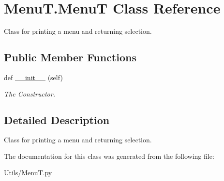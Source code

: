 \hypertarget{classMenuT_1_1MenuT}{}\section{Menu\+T.\+MenuT Class Reference}
\label{classMenuT_1_1MenuT}


Class for printing a menu and returning selection.  


\subsection*{Public Member Functions}
\begin{DoxyCompactItemize}
\item 
\mbox{\label{classMenuT_1_1MenuT_a560d1fcb631423d0214d5878d0cd6f06}} 
def \hyperlink{classMenuT_1_1MenuT_a560d1fcb631423d0214d5878d0cd6f06}{\+\_\+\+\_\+init\+\_\+\+\_\+} (self)
\begin{DoxyCompactList}\small\item\em The Constructor. \end{DoxyCompactList}\end{DoxyCompactItemize}


\subsection{Detailed Description}
Class for printing a menu and returning selection. 



The documentation for this class was generated from the following file\+:\begin{DoxyCompactItemize}
\item 
Utils/Menu\+T.\+py\end{DoxyCompactItemize}
